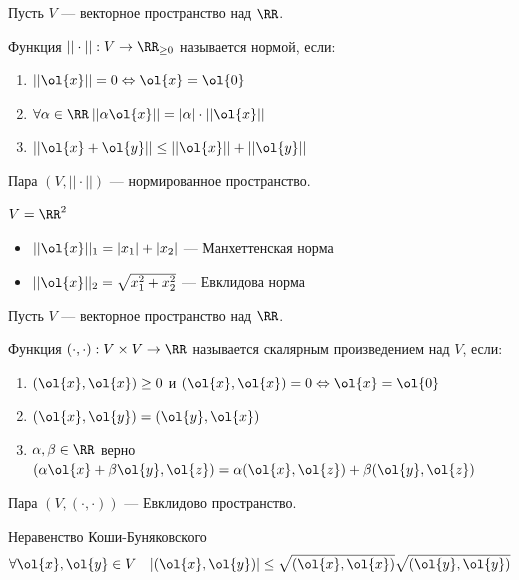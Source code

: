 \begin{defn}{}{}
    Пусть \( V \) --- векторное пространство над \( \RR \).

    Функция \( || \cdot || : V \to \RR_{\geq 0} \) называется нормой, если:
    \begin{enumerate}
        \item
            \( || \ol{x} || = 0 \Leftrightarrow \ol{x} = \ol{0} \)
        \item
            \( \forall \alpha \in \RR \: || \alpha \ol{x} || = | \alpha | \cdot || \ol{x} || \)
        \item
            \( || \ol{x} + \ol{y} || \leq || \ol{x} || + || \ol{y} || \)
    \end{enumerate}

    Пара \( (V, || \cdot ||) \) --- нормированное пространство.
\end{defn}

\begin{example}{}{}
    \( V = \RR^2 \)

    \begin{itemize}
        \item
            \( || \ol{x} ||_1 = |x_1| + |x_2| \) --- Манхеттенская норма
        \item
            \( || \ol{x} ||_2 = \sqrt{x_1^2 + x_2^2} \) --- Евклидова норма
    \end{itemize}
\end{example}

\begin{defn}{}{}
    Пусть \( V \) --- векторное пространство над \( \RR \).

    Функция \( (\cdot, \cdot) : V \times V \to \RR \) называется скалярным произведением над \( V \), если:
    \begin{enumerate}
        \item
            \( (\ol{x}, \ol{x}) \geq 0 \) и \( (\ol{x}, \ol{x}) = 0 \Leftrightarrow \ol{x} = \ol{0} \)
        \item
            \( (\ol{x}, \ol{y}) = (\ol{y}, \ol{x}) \)
        \item
            \( \alpha, \beta \in \RR \) верно
            \( (\alpha \ol{x} + \beta \ol{y}, \ol{z}) = \alpha (\ol{x}, \ol{z}) + \beta (\ol{y}, \ol{z}) \)
    \end{enumerate}

    Пара \( (V, (\cdot, \cdot)) \) --- Евклидово пространство.
\end{defn}

\begin{thrm}{Неравенство Коши-Буняковского}{}
    \[
        \forall \ol{x}, \ol{y} \in V \quad |(\ol{x}, \ol{y})| \leq \sqrt{(\ol{x}, \ol{x})} \sqrt{(\ol{y}, \ol{y})}
    \]
\end{thrm}

